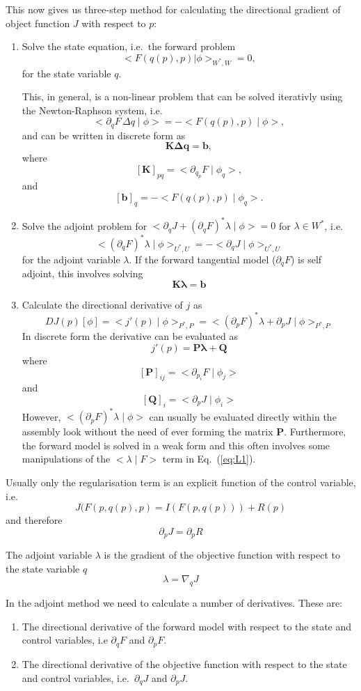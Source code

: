 \documentclass[10pt,a4paper]{book}
\newcommand{\p}{\partial}
\begin{document}
This now gives us three-step method for calculating the directional
gradient of object function $J$ with respect to $p$:
\begin{enumerate}
\item Solve the state equation, i.e.\ the forward problem 
\[ 
<F(q(p),p)| \phi >_{W^\ast , W} = 0 ,
\]
 for the state variable $q$. 
  
This, in  general, is a non-linear problem that can be solved iterativly using the Newton-Raphson system, i.e. 
\[
 < \p_q F \, \Delta q \mid \phi > = - <F(q(p),p) \mid \phi>  ,
\]
and can be written in discrete form as
\[
 \bm{K} \bm{\Delta q} = \bm{b} ,
\]
where
\[ [\bm{K}]_{pq} = < \p_{q_p} F \mid \phi_q > , \] 
and
\[ [\bm{b}]_q= - < F(q(p),p) \mid \phi_q > . \] 

\item Solve the adjoint problem for $< \p_q J +( \p_q F)^\ast\lambda \mid \phi >  =0$ for $\lambda \in W^\ast$, i.e.
\[
  <( \p_q F)^\ast\lambda \mid \phi >_{U^\ast , U}  = - < \p_q J \mid \phi >_{U^\ast , U} 
\]
for the adjoint variable $\lambda$. If the forward tangential model
($\p_q F$) is self adjoint, this involves solving
\[
 \bm{K} \bm{\lambda} = \bm{b}
\]

\item Calculate the directional derivative of $j$ as 
\[ 
 D J(p)[\phi] = <j'(p) \mid \phi>_{P^\ast,P} = < (\p_p F)^\ast \lambda  + \p_p J \mid  \phi >_{P^\ast,P} 
\]
In discrete form the derivative can be evaluated as
\[
j'(p)= \bm{P} \bm{\lambda} + \bm{Q}
\]
where
\[ [\bm{P}]_{ij} = < \p_{p_i} F \mid  \phi_j > \]
and
\[ [\bm{Q}]_i =< \p_p J \mid \phi_i > \] However,
$< (\p_p F)^\ast \lambda \mid \phi >$ can usually be evaluated directly within
the assembly look without the need of ever forming the matrix
$\bm{P}$. Furthermore, the forward model is solved in a weak form and
this often involves some manipulations of the $< \lambda \mid F >$ term
in Eq.~(\ref{eq:L1}).
 \end{enumerate}


Usually only the regularisation term is an explicit function of the
control variable, i.e.
\[
 J(F(p,q(p),p)=I(F(p,q(p)))+R(p)
\]
and therefore
\[
  \p_p J=  \p_p R 
\]




The adjoint variable $\lambda$ is the gradient of the objective
function with respect to the state variable $q$
\[
\lambda= \nabla_q J
\] 


In the adjoint method we need to calculate a number of derivatives. These are:
\begin{enumerate}
\item The directional derivative of the forward model with respect to
  the state and control variables, i.e $\p_q F$ and $\p_p F$.
\item The directional derivative of the objective function with
  respect to the state and control variables, i.e.\ $\p_q J$ and $\p_p
  J$.
\end{enumerate}
\end{document}
